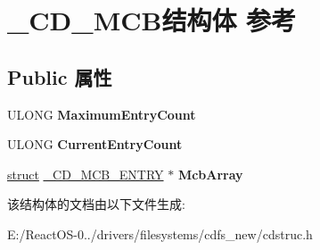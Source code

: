 \hypertarget{struct___c_d___m_c_b}{}\section{\+\_\+\+C\+D\+\_\+\+M\+C\+B结构体 参考}
\label{struct___c_d___m_c_b}
\subsection*{Public 属性}
\begin{DoxyCompactItemize}
\item 
\mbox{\label{struct___c_d___m_c_b_a452991e103a253e1448a0d2012021e2e}} 
U\+L\+O\+NG {\bfseries Maximum\+Entry\+Count}
\item 
\mbox{\label{struct___c_d___m_c_b_a13fb8355586c829acdde58b3b8c23e1f}} 
U\+L\+O\+NG {\bfseries Current\+Entry\+Count}
\item 
\mbox{\label{struct___c_d___m_c_b_a60e5a33470ee669dd51bd9f7dc36d55e}} 
\hyperlink{interfacestruct}{struct} \hyperlink{struct___c_d___m_c_b___e_n_t_r_y}{\+\_\+\+C\+D\+\_\+\+M\+C\+B\+\_\+\+E\+N\+T\+RY} $\ast$ {\bfseries Mcb\+Array}
\end{DoxyCompactItemize}


该结构体的文档由以下文件生成\+:\begin{DoxyCompactItemize}
\item 
E\+:/\+React\+O\+S-\/0../drivers/filesystems/cdfs\+\_\+new/cdstruc.\+h\end{DoxyCompactItemize}
